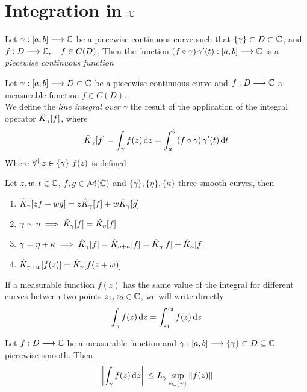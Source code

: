 \documentclass[../complete.tex]{subfiles}
\begin{document}
\section{Integration in $\mathbb{C}$}
\begin{dfn}
	Let $\gamma:[a,b]\overset{}{\longrightarrow}\mathbb{C}$ be a piecewise continuous curve such that $\{\gamma\}\subset D\subset\mathbb{C}$, and $f:D\overset{}{\longrightarrow}\mathbb{C},\quad f\in C(D)$. Then the function $\left( f\circ\gamma \right)\gamma'(t):[a,b]\overset{}{\longrightarrow}\mathbb{C}$ is a \textit{piecewise continuous function}
\end{dfn}
\begin{dfn}
	Let $\gamma:[a,b]\overset{}{\longrightarrow} D\subset\mathbb{C}$ be a piecewise continuous curve and $f:D\overset{}{\longrightarrow}\mathbb{C}$ a measurable function $f\in C(D)$.\\
	We define the \textit{line integral over }$\gamma$ the result of the application of the integral operator $\hat{K}_\gamma[f]$, where
	\begin{equation}
		\hat{K}_\gamma[f]=\int_{\gamma}^{}f(z)\operatorname{d\!} z=\int_{a}^{b}\left( f\circ\gamma \right)\gamma'(t)\operatorname{d\!} t
		\label{eq:lineintcf}
	\end{equation}
	Where $\operatorname{\forall^\dagger} z\in\{\gamma\}\ f(z)$ is defined
\end{dfn}
\begin{thm}
	Let $z,w,t\in\mathbb{C}$, $f,g\in\mathcal{M}(\mathbb{C})$ and $\{\gamma\},\{\eta\},\{\kappa\}$ three smooth curves, then
	\begin{enumerate}
	\item $\hat{K}_\gamma[zf+wg]=z\hat{K}_\gamma[f]+w\hat{K}_\gamma[g]$
	\item $\gamma\sim\eta\implies{}\hat{K}_\gamma[f]=\hat{K}_\eta[f]$
	\item $\gamma=\eta+\kappa\implies{}\hat{K}_{\gamma}[f]=\hat{K}_{\eta+\kappa}[f]=\hat{K}_\eta[f]+\hat{K}_\kappa[f]$
	\item $\hat{K}_{\gamma+w}[f(z)]=\hat{K}_\gamma[f(z+w)]$
	\end{enumerate}
\end{thm}
\begin{ntn}
	If a measurable function $f(z)$ has the same value of the integral for different curves between two points $z_1,z_2\in\mathbb{C}$, we will write directly
	\begin{equation*}
		\int_{\gamma}^{}f(z)\operatorname{d\!} z=\int_{z_1}^{z_2}f(z)\operatorname{d\!} z
	\end{equation*}
\end{ntn}
\begin{thm}
	Let $f:D\overset{}{\longrightarrow}\mathbb{C}$ be a measurable function and $\gamma:[a,b]\overset{}{\longrightarrow}\{\gamma\}\subset D\subseteq\mathbb{C}$ piecewise smooth. Then
	\begin{equation*}
		\norm{\int_{\gamma}^{}f(z)\operatorname{d\!} z}\le L_\gamma\sup_{z\in\{\gamma\}}\norm{f(z)}
	\end{equation*}
\end{thm}
\end{document}

